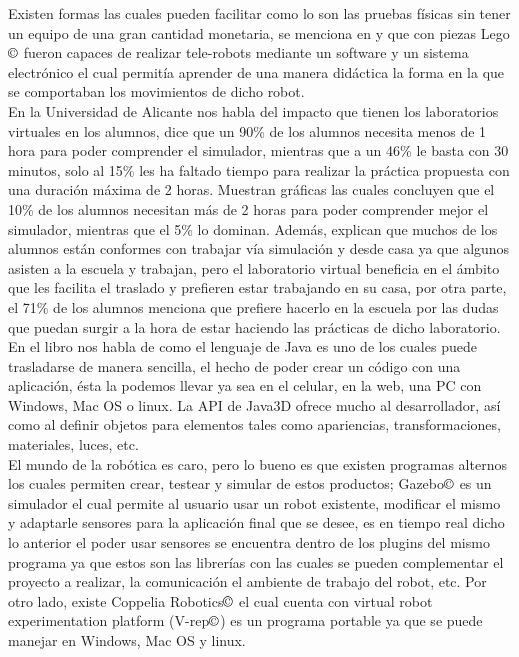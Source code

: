Existen formas las cuales pueden facilitar como lo son las pruebas físicas sin tener un equipo de una gran cantidad monetaria, se menciona en \cite{berenguel-2016} y \cite{lancheros-2010} que con piezas Lego$\copyright$  fueron capaces de realizar tele-robots mediante un software y un sistema electrónico el cual permitía aprender de una manera didáctica la forma en la que se comportaban los movimientos de dicho robot.\\

En la Universidad de Alicante \cite{pomares-2004} nos habla del impacto que tienen los laboratorios virtuales en los alumnos, dice que un 90\% de los alumnos necesita menos de 1 hora para poder comprender el simulador, mientras que a un 46\% le basta con 30 minutos, solo al 15\% les ha faltado tiempo para realizar la práctica propuesta con una duración máxima de 2 horas. Muestran gráficas las cuales concluyen que el 10\% de los alumnos necesitan más de 2 horas para poder comprender mejor el simulador, mientras que el 5\% lo dominan. Además, explican que muchos de los alumnos están conformes con trabajar vía simulación y desde casa ya que algunos asisten a la escuela y trabajan, pero el laboratorio virtual beneficia en el ámbito que les facilita el traslado y prefieren estar trabajando en su casa, por otra parte, el 71\% de los alumnos menciona que prefiere hacerlo en la escuela por las dudas que puedan surgir a la hora de estar haciendo las prácticas de dicho laboratorio.\\

En el libro \cite{selman-2002} nos habla de como el lenguaje de Java es uno de los cuales puede trasladarse de manera sencilla, el hecho de poder crear un código con una aplicación, ésta la podemos llevar ya sea en el celular, en la web, una PC con Windows, Mac OS o linux. La API de Java3D ofrece mucho al desarrollador, así como al definir objetos para elementos tales como apariencias, transformaciones, materiales, luces, etc.\\

El mundo de la robótica es caro, pero lo bueno es que existen programas alternos los cuales permiten crear, testear y simular de estos productos; Gazebo$\copyright$ \cite{gazebo-2014} es un simulador el cual permite al usuario usar un robot existente, modificar el mismo y adaptarle sensores para la aplicación final que se desee, es en tiempo real dicho lo anterior el poder usar sensores se encuentra dentro de los plugins del mismo programa ya que estos son las librerías con las cuales se pueden complementar el proyecto a realizar, la comunicación el ambiente de trabajo del robot, etc. Por otro lado, existe Coppelia Robotics$\copyright$ el cual cuenta con virtual robot experimentation platform (V-rep$\copyright$) es un programa portable ya que se puede manejar en Windows, Mac OS y linux.

